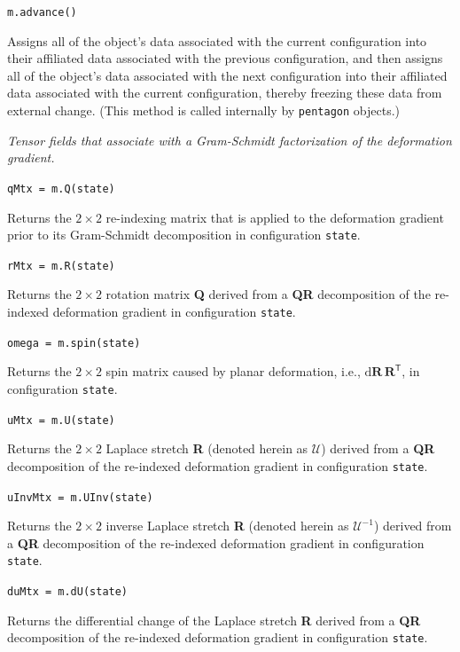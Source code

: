 \medskip\noindent
\texttt{m.advance()}

\medskip\noindent
Assigns all of the object's data associated with the current configuration into their affiliated data associated with the previous configuration, and then assigns all of the object's data associated with the next configuration into their affiliated data associated with the current configuration, thereby freezing these data from external change.  (This method is called internally by \texttt{pentagon} objects.)

\medskip\noindent
\textit{Tensor fields that associate with a Gram-Schmidt factorization of the deformation gradient.}

\medskip\noindent
\texttt{qMtx = m.Q(state)}

\medskip\noindent
Returns the $2 \times 2$ re-indexing matrix that is applied to the deformation gradient prior to its Gram-Schmidt decomposition in configuration \texttt{state}.

\medskip\noindent
\texttt{rMtx = m.R(state)}

\medskip\noindent
Returns the $2 \times 2$ rotation matrix \textbf{Q} derived from a \textbf{QR} decomposition of the re-indexed deformation gradient in configuration \texttt{state}.

\medskip\noindent
\texttt{omega = m.spin(state)}

\medskip\noindent
Returns the $2 \times 2$ spin matrix caused by planar deformation, i.e., $\mathrm{d} \mathbf{R} \, \mathbf{R}^{\mathsf{T}}$, in configuration \texttt{state}.

\medskip\noindent
\texttt{uMtx = m.U(state)}

\medskip\noindent
Returns the $2 \times 2$ Laplace stretch \textbf{R} (denoted herein as $\boldsymbol{\mathcal{U}}$) derived from a \textbf{QR} decomposition of the re-indexed deformation gradient in configuration \texttt{state}.

\medskip\noindent
\texttt{uInvMtx = m.UInv(state)}

\medskip\noindent
Returns the $2 \times 2$ inverse Laplace stretch \textbf{R} (denoted herein as $\boldsymbol{\mathcal{U}}^{-1}$) derived from a \textbf{QR} decomposition of the re-indexed deformation gradient in configuration \texttt{state}.

\medskip\noindent
\texttt{duMtx = m.dU(state)}

\medskip\noindent
Returns the differential change of the Laplace stretch \textbf{R} derived from a \textbf{QR} decomposition of the re-indexed deformation gradient in configuration \texttt{state}.

